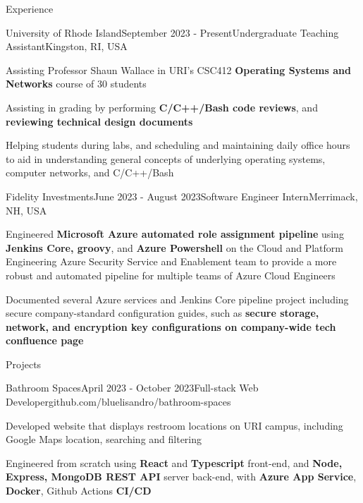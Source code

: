 \documentclass[
	11pt, %
]{resume} %
\begin{document}
\begin{rSection}{Experience}

	\begin{rSubsection}{University of Rhode Island}{September 2023 - Present}{Undergraduate Teaching Assistant}{Kingston, RI, USA}
		\item Assisting Professor Shaun Wallace in URI's CSC412  \textbf{Operating Systems and Networks} course of 30 students
		\item Assisting in grading by performing  \textbf{C/C++/Bash code reviews}, and  \textbf{reviewing technical design documents}
		\item Helping students during labs, and scheduling and maintaining daily office hours to aid in understanding general concepts of underlying  operating systems, computer networks, and C/C++/Bash
	\end{rSubsection}

	\begin{rSubsection}{Fidelity Investments}{June 2023 - August 2023}{Software Engineer Intern}{Merrimack, NH, USA}
		\item Engineered \textbf{Microsoft Azure automated role assignment pipeline} using \textbf{Jenkins Core, groovy}, and \textbf{Azure Powershell} on the Cloud and Platform Engineering Azure Security Service and Enablement team to provide a more robust and automated pipeline for multiple teams of Azure Cloud Engineers
		\item Documented several Azure services and Jenkins Core pipeline project including secure company-standard configuration guides, such as  \textbf{secure storage, network, and encryption key configurations on company-wide tech confluence page}
	\end{rSubsection}

\end{rSection}

\begin{rSection}{Projects}

	\begin{rSubsection}{Bathroom Spaces}{April 2023 - October 2023}{Full-stack Web Developer}{github.com/bluelisandro/bathroom-spaces}
		\item Developed website that displays restroom locations on URI campus, including Google Maps location, searching and filtering
		\item Engineered from scratch using \textbf{React} and \textbf{Typescript} front-end, and \textbf{Node, Express, MongoDB REST API} server back-end, with \textbf{Azure App Service}, \textbf{Docker}, Github Actions \textbf{CI/CD}
	\end{rSubsection}

\end{rSection}
\end{document}
